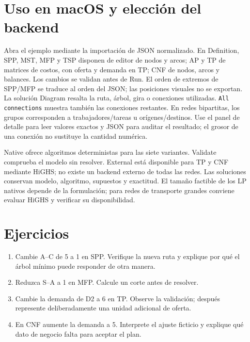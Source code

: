 \section{Uso en macOS y elección del backend}
Abra el ejemplo mediante la importación de JSON normalizado. En Definition,
SPP, MST, MFP y TSP disponen de editor de nodos y arcos;
AP y TP de matrices de costos, con oferta y demanda en TP; CNF de nodos,
arcos y balances. Los cambios se validan antes de Run. El orden de extremos
de SPP/MFP se traduce al orden del JSON; las posiciones visuales no se exportan.
La solución Diagram resalta la ruta, árbol, gira o conexiones utilizadas.
\texttt{All connections} muestra también las conexiones restantes. En redes
bipartitas, los grupos corresponden a trabajadores/tareas u orígenes/destinos.
Use el panel de detalle para leer valores exactos y JSON para auditar el resultado;
el grosor de una conexión no sustituye la cantidad numérica.

Native ofrece algoritmos deterministas para las siete variantes. Validate
comprueba el modelo sin resolver. External está disponible para TP y CNF
mediante HiGHS; no existe un backend externo de todas las redes.
Las soluciones conservan modelo, algoritmo, supuestos y exactitud. El tamaño
factible de los LP nativos depende de la formulación; para redes de transporte
grandes conviene evaluar HiGHS y verificar su disponibilidad.

\section{Ejercicios}
\begin{enumerate}
\item Cambie A--C de 5 a 1 en SPP. Verifique la nueva ruta y explique por qué
      el árbol mínimo puede responder de otra manera.
\item Reduzca S--A a 1 en MFP. Calcule un corte antes de resolver.
\item Cambie la demanda de D2 a 6 en TP. Observe la validación; después
      represente deliberadamente una unidad adicional de oferta.
\item En CNF aumente la demanda a 5. Interprete el ajuste ficticio y explique
      qué dato de negocio falta para aceptar el plan.
\end{enumerate}
